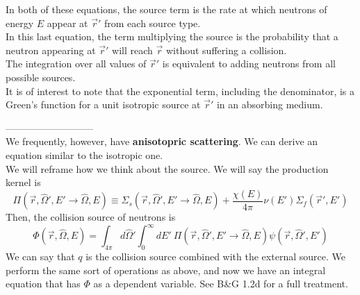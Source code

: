 \documentclass[12pt]{article}
\newcommand{\rvec}{\ensuremath{\vec{r}}}
\newcommand{\vOmega}{\ensuremath{\hat{\Omega}}}
\begin{document}
In both of these equations, the source term is the rate at which neutrons of energy $E$ appear at $\vec{r}'$ from each source type. \\
In this last equation, the term multiplying the source is the probability that a neutron appearing at $\vec{r}'$ will reach $\vec{r}$ without suffering a collision.\\
The integration over all values of $\vec{r}'$ is equivalent to adding neutrons from all possible sources. \\
It is of interest to note that the exponential term, including the denominator, is a Green's function for a unit isotropic source at $\vec{r}'$ in an absorbing medium.

---------------------------\\
We frequently, however, have \textbf{anisotopric scattering}. We can derive an equation similar to the isotropic one.\\
We will reframe how we think about the source. We will say the production kernel is
%
\[\Pi(\rvec, \vOmega',E' \rightarrow \vOmega, E) \equiv \Sigma_s(\rvec, \vOmega',E' \rightarrow \vOmega, E) + \frac{\chi(E)}{4\pi} \nu(E') \Sigma_f(\rvec', E')\]
Then, the collision source of neutrons is
\[\Phi(\vec{r}, \vOmega, E) = \int_{4\pi} d\vOmega' \int_0^{\infty} dE' \: \Pi(\rvec, \vOmega',E' \rightarrow \vOmega, E) \psi(\rvec, \vOmega', E')\]
%
We can say that $q$ is the collision source combined with the external source. We perform the same sort of operations as above, and now we have an integral equation that has $\Phi$ as a dependent variable. See B\&G 1.2d for a full treatment.
\end{document}
